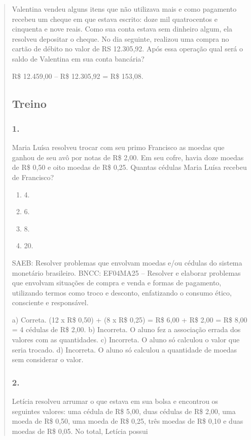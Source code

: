 \begin{enumerate}
\begin{escolha}
\begin{enumerate}
\begin{itemize}
\begin{itemize}
\begin{escolha}
\begin{quote}
\begin{escolha}
Valentina vendeu alguns itens que não utilizava mais e como pagamento
recebeu um cheque em que estava escrito: doze mil quatrocentos e
cinquenta e nove reais. Como sua conta estava sem dinheiro algum, ela
resolveu depositar o cheque. No dia seguinte, realizou uma compra no
cartão de débito no valor de RS 12.305,92. Após essa operação qual será o
saldo de Valentina em sua conta bancária?

R\$ 12.459,00 -- R\$ 12.305,92 = R\$ 153,08.

\subsection{Treino}\label{treino-5}

\subsubsection{1.}\label{section-75}

Maria Luísa resolveu trocar com seu primo Francisco as moedas que ganhou de seu avô por notas de
R\$ 2,00. Em seu cofre, havia doze moedas de R\$ 0,50
e oito moedas de R\$ 0,25. Quantas cédulas Maria Luísa recebeu de Francisco?

\begin{enumerate}
\def\labelenumi{\alph{enumi})}
\item
  4.
\item
  6.
\item
  8.
\item
  20.
\end{enumerate}

SAEB: Resolver problemas que envolvam moedas e/ou cédulas do sistema monetário brasileiro.
BNCC: EF04MA25 -- Resolver e elaborar problemas que envolvam situações de compra e venda e formas
de pagamento, utilizando termos como troco e desconto, enfatizando o consumo ético, consciente e
responsável.

a) Correta. (12 x R\$ 0,50) + (8 x R\$ 0,25) = R\$ 6,00 + R\$ 2,00 = R\$ 8,00 = 4 cédulas de R\$ 2,00.
b) Incorreta. O aluno fez a associação errada dos valores com as quantidades.
c) Incorreta. O aluno só calculou o valor que seria trocado.
d) Incorreta. O aluno só calculou a quantidade de moedas sem considerar o valor.


\subsubsection{2.}\label{section-76}

Letícia resolveu arrumar o que estava em sua bolsa e encontrou
os seguintes valores: uma cédula de R\$ 5,00, duas cédulas de R\$ 2,00, uma moeda de R\$ 0,50, uma moeda de R\$ 0,25, três moedas de R\$ 0,10 e duas moedas de R\$ 0,05. No total, Letícia possui


\end{escolha}
\end{quote}
\end{escolha}
\end{itemize}
\end{itemize}
\end{enumerate}
\end{escolha}
\end{enumerate}
